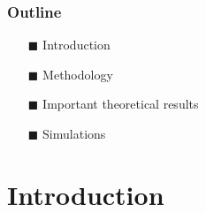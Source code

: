 

\begin{frame}
\frametitle{Outline}


\begin{itemize}

  \item[$\blacksquare$] Introduction

  \vspace{5mm}

  \item[$\blacksquare$] Methodology

%
%
%

 \vspace{5mm}

 \item[$\blacksquare$] Important theoretical results

  \vspace{5mm}

  \item[$\blacksquare$] Simulations

  \vspace{5mm}

%
%

\end{itemize}
\end{frame}

\section{Introduction}
\begin{frame}
\sectionpage
\end{frame}

